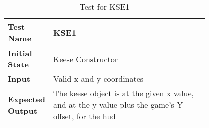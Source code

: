 \documentclass[12pt, titlepage]{article}
\begin{document}
\begin{table}[!htbp]
	
	\begin{tabular}[r]{|l|p{0.8\linewidth}|}
		
		\hline
		
		\textbf{Test Name} & KSE1 \\ 
		\hline
		\textbf{Initial State} & Keese Constructor \\ 
		\hline
		\textbf{Input} & Valid x and y coordinates \\ 
		\hline 
		\textbf{Expected Output} & The keese object is at the given x value, and at the y value plus the game's Y-offset, for the hud  \\ 
		\hline
		
	\end{tabular}
	\caption{Test for KSE1}
	\label{Table}
\end{table}
\end{document}
